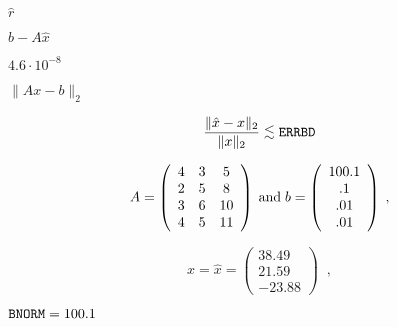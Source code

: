 {\newpage\clearpage
{}%
$\hat{r}$%
\lthtmlinlinemathZ
\lthtmlcheckvsize\clearpage}

{\newpage\clearpage
{}%
$b-A \hat{x}$%
\lthtmlinlinemathZ
\lthtmlcheckvsize\clearpage}

{\newpage\clearpage
{}%
$4.6 \cdot 10^{-8}$%
\lthtmlinlinemathZ
\lthtmlcheckvsize\clearpage}

{\newpage\clearpage
{}%
$\| Ax-b \|_2$%
\lthtmlinlinemathZ
\lthtmlcheckvsize\clearpage}

{\newpage\clearpage
{}%
\begin{displaymath}
\frac{\| \hat{x} - x \|_2}{\| x \|_2} \mathrel{\raisebox{-.75ex}{$\mathop{\sim}\limits^{\textstyle <}$}}{\tt ERRBD}
\end{displaymath}%
\lthtmldisplayZ
\lthtmlcheckvsize\clearpage}

{\newpage\clearpage
{}%
\begin{displaymath}
A = \left( \begin{array}{ccc} 4 & 3 & 5 \\2 & 5 & 8 \\3 & 6 & 10 \\4 & 5 & 11 \end{array} \right) 
\; {\rm and} \;
b = \left( \begin{array}{c} 100.1 \\.1 \\.01 \\.01 \end{array} \right) \; ,
\end{displaymath}%
\lthtmldisplayZ
\lthtmlcheckvsize\clearpage}

{\newpage\clearpage
{}%
\begin{displaymath}
x = \hat{x} = \left( \begin{array}{c} 38.49 \\21.59 \\-23.88 \end{array} \right) \; \; ,
\end{displaymath}%
\lthtmldisplayZ
\lthtmlcheckvsize\clearpage}

{\newpage\clearpage
{}%
${\tt BNORM} = 100.1$%
\lthtmlinlinemathZ
\lthtmlcheckvsize\clearpage}

